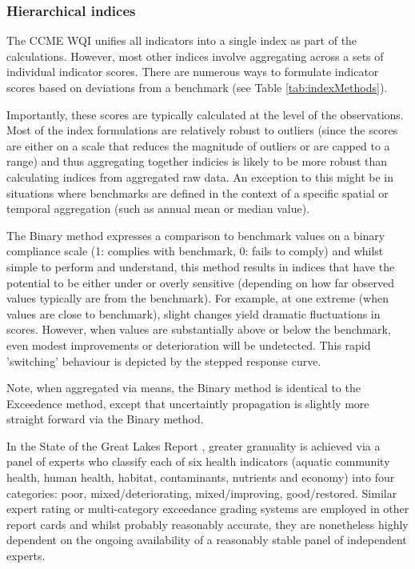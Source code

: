 \subsubsection{Hierarchical indices}\label{sec:hierarchicalIndices}

The CCME WQI unifies all indicators into a single index as part of the calculations.  However, most
other indices involve aggregating across a sets of individual indicator scores.  There are numerous
ways to formulate indicator scores based on deviations from a benchmark (see Table
\ref{tab:indexMethods}).

Importantly, these scores are typically calculated at the level of the observations.  Most of the
index formulations are relatively robust to outliers (since the scores are either on a scale that
reduces the magnitude of outliers or are capped to a range) and thus aggregating together indicies
is likely to be more robust than calculating indices from aggregated raw data.  An exception to this
might be in situations where benchmarks are defined in the context of a specific spatial or temporal
aggregation (such as annual mean or median value).

The Binary method expresses a comparison to benchmark values on a binary compliance scale (1:
complies with benchmark, 0: fails to comply) and whilst simple to perform and understand, this
method results in indices that have the potential to be either under or overly sensitive (depending
on how far observed values typically are from the benchmark).  For example, at one extreme (when
values are close to benchmark), slight changes yield dramatic fluctuations in scores.  However, when
values are substantially above or below the benchmark, even modest improvements or deterioration
will be undetected.  This rapid 'switching' behaviour is depicted by the stepped response curve.

Note, when aggregated via means, the Binary method is identical to the Exceedence method, except
that uncertaintly propagation is slightly more straight forward via the Binary method.


In the State of the Great Lakes Report \citep{EPA/EC-1995}, greater granuality is achieved via a
panel of experts who classify each of six health indicators (aquatic community health, human health,
habitat, contaminants, nutrients and economy) into four categories: poor, mixed/deteriorating,
mixed/improving, good/restored.  Similar expert rating or multi-category exceedance grading systems
are employed in other report cards \citep[e.g Tamar estuary Report Card;][]{Attard-2012} and whilst
probably reasonably accurate, they are nonetheless highly dependent on the ongoing availability of a
reasonably stable panel of independent experts.


